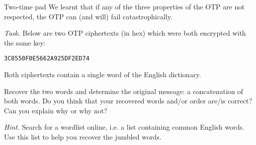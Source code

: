 \documentclass{practice}
\begin{document}
\begin{task}{Two-time pad}
  We learnt that if any of the three properties of the OTP are not respected, the OTP can (and will) fail catastrophically.

  \textit{Task.}
  Below are two OTP ciphertexts (in hex) which were both encrypted with the same key:
  \begin{center}
    \texttt{3C8550F0E566}\hspace*{5em}\texttt{2A925DF2ED74}
  \end{center}
  Both ciphertexts contain a single word of the English dictionary.

  Recover the two words and determine the original message: a concatenation of both words.
  Do you think that your recovered words and/or order are/is correct?
  Can you explain why or why not?

  \textit{Hint.}
  Search for a wordlist online, i.e. a list containing common English words.
  Use this list to help you recover the jumbled words.

  \iffalse
  If you want to check your answers, here is the solution `encrypted' with ROT13 (shift cipher with key 13):
  Gur gjb jbeqf ner lryybj naq benatr, ohg V qb abg rira erzrzore jurgure gur beqre jnf lryybjbenatr be benatrlryybj. Va snpg, vg vf vzcbffvoyr gb erpbire gur beqre bs gur gjb jbeqf (jrer gurl pbapngrangrq va gur pvcuregrkg) fvapr KBE vf pbzzhgngvir, naq obgu pbybhef pbhyq or zrnavatshy. Vg zvtug nyfb or gung gurer rkvfg bgure Ratyvfu jbeqf, be ng yrnfg pbzovangvbaf bs nycunorg yrggref juvpu fngvfsl gur KBE. Fb, juvyr er-hfvat gur xrl oebxr gur cresrpg frperpl, guvf rknzcyr fgvyy cnegyl uvtuyvtugf ubj jryy gur BGC uvqrf vasbezngvba: nyy nafjref juvpu svg ner cbffvoyr.
  \fi
\end{task}
\end{document}
